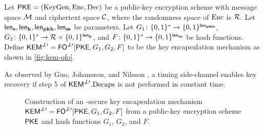 \documentclass{iacrcc}
\begin{document}
\begin{definition}
  \label{def:qfo}
  Let $\PKE=(\KeyGen,\Enc,\Dec)$ be a public-key encryption scheme
  with message space $\MsgSp$ and ciphertext space $\CtxtSp$, where
  the randomness space of $\Enc$ is $\RandSp$.  Let
  $\lengths, \lengthK, \lengthpkhash, \lengthss$ be parameters.  Let
  $G_1\colon \{0,1\}^* \to \{0,1\}^\lengthpkhash$,
  $G_2\colon \{0,1\}^* \to \RandSp \times \{0,1\}^\lengthK$, and
  $F\colon \{0,1\}^* \to \{0,1\}^\lengthss$ be hash functions.  Define
  $\KEMnotperpprime = \FOnotperpprime[\PKE,G_1,G_2,F]$ to be the key
  encapsulation mechanism as shown in \autoref{fig:kem-qfo}.
\end{definition}

As observed by Guo, Johansson, and Nilsson \cite{C:GuoJohNil20}, a timing side-channel enables key recovery if step 5 of $\KEMnotperpprime.\Decaps$ is not performed in constant time.

\begin{figure}[h]
\centering
{}
\caption{Construction of an \INDCCA-secure key encapsulation mechanism
  $\KEMnotperpprime=\FOnotperpprime[\PKE,G_1,G_2,F]$ from a public-key
  encryption scheme $\PKE$ and hash functions $G_1$, $G_2$, and $F$.}
\label{fig:kem-qfo}
\end{figure}
\end{document}
